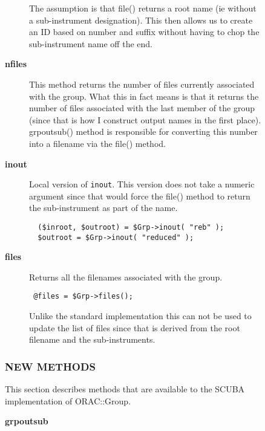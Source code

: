\begin{description}
\begin{description}
\begin{description}
The assumption is that file() returns a root name (ie without
a sub-instrument designation). This then allows us to create an
ID based on number and suffix without having to chop the
sub-instrument name off the end.


\item[{\textbf{nfiles}}] \mbox{}

This method returns the number of files currently associated
with the group. What this in fact means is that it returns
the number of files associated with the last member of the 
group (since that is how I construct output names in the
first place). grpoutsub() method is responsible for 
converting this number into a filename via the file() method.


\item[{\textbf{inout}}] \mbox{}

Local version of \texttt{inout}. This version does not take a numeric argument
since that would force the file() method to return the sub-instrument as
part of the name.

\begin{verbatim}
  ($inroot, $outroot) = $Grp->inout( "reb" );
  $outroot = $Grp->inout( "reduced" );
\end{verbatim}

\item[{\textbf{files}}] \mbox{}

Returns all the filenames associated with the group.

\begin{verbatim}
 @files = $Grp->files();
\end{verbatim}


Unlike the standard implementation this can not be used to update the list
of files since that is derived from the root filename and the sub-instruments.

\end{description}
\subsubsection*{NEW METHODS\label{ORAC::Group::SCUBA_NEW_METHODS}}


This section describes methods that are available to the
SCUBA implementation of ORAC::Group.

\begin{description}

\item[{\textbf{grpoutsub}}] \mbox{}


\end{description}
\end{description}
\end{description}
